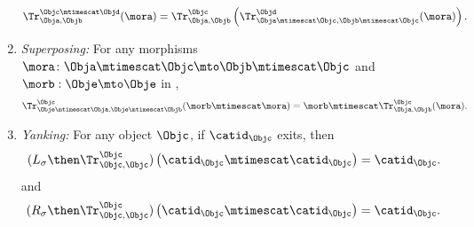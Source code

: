\begin{ctdefinition}
\begin{enumerate}
              \begin{equation}
                  \label{eq:semicat-trace-vanishing_2}
                  \Tr_{\Obja,\Objb}^{\Objc\mtimescat \Objd}(\mora)=\Tr_{\Obja,\Objb}^\Objc\left(
                  \Tr_{\Obja \mtimescat \Objc , \Objb \mtimescat \Objc}^\Objd(\mora)\right).
              \end{equation}
        \item \emph{Superposing:}
              For any morphisms~$\mora\colon \Obja\mtimescat \Objc \mto \Objb\mtimescat \Objc$ and $\morb : \Obje \mto \Obje$ in \CatC,
              \begin{equation}
                  \label{eq:semicat-trace-superposing}
                  \Tr_{\Obje\mtimescat \Obja,\Obje\mtimescat \Objb}^{\Objc}(\morb \mtimescat \mora)=\morb \mtimescat \Tr_{\Obja,\Objb}^\Objc(\mora).
              \end{equation}
        \item \emph{Yanking:}
              For any object $\Objc$, if $\catid_\Objc$ exits, then
              \begin{equation}
                  \label{eq:semicat-trace-yanking-I}
                  (L_\sigma  \then \Tr_{\Objc,\Objc}^\Objc)\left(\catid_\Objc \mtimescat \catid_\Objc \right)=\catid_\Objc.
              \end{equation}
              and
              \begin{equation}
                  \label{eq:semicat-trace-yanking-II}
                  (R_\sigma  \then \Tr_{\Objc,\Objc}^\Objc)\left(\catid_\Objc \mtimescat \catid_\Objc \right)=\catid_\Objc.              \end{equation}
    \end{enumerate}
\end{ctdefinition}



